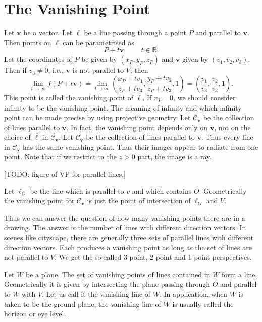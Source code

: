 \documentclass{amsart}
\newcommand{\cC}{\mathcal {C}}
\newcommand{\RR}{\mathbb {R}}
\newcommand {\bv} {\mathbf {v}}
\begin{document}
\section{The Vanishing Point}
\label{sec:vanishing-point}

Let $\bv$ be a vector. Let $\ell$ be a line passing through a point $P$ and parallel to $\bv$. Then points on $\ell$ can be parametrised as
\begin{equation*}
  P + t\bv,\qquad t\in\RR.
\end{equation*}
Let the coordinates of $P$ be given by $(x_P,y_P,z_P)$ and $\bv$ given by $(v_1,v_2,v_3)$. Then if $v_3\neq 0$, i.e., $\bv$ is not parallel to $V$, then
\begin{equation*}
  \lim_{t\rightarrow \infty} f (P + t\bv)
  = \lim_{t\rightarrow \infty} (\frac{x_P+tv_1}{z_P+tv_3},\frac{y_P+tv_2}{z_P+tv_3},1)
  = (\frac{v_1}{v_3},\frac{v_2}{v_3},1).
\end{equation*}
This point is called the vanishing point of $\ell$. If $v_3=0$, we should consider infinity to be the vanishing point. The meaning of infinity and which infinity point can be made precise by using projective geometry.
Let $\cC_\bv$ be the collection of lines parallel to $\bv$. In fact, the vanishing point depends only on $\bv$, not on the choice of $\ell$ in $\cC_\bv$. Let $\cC_\bv$ be the collection of lines parallel to $\bv$. Thus every line in $\cC_\bv$ has the same vanishing point. Thus their images appear to radiate from one point. Note that if we restrict to the $z>0$ part, the image is a ray.

[TODO: figure of VP for parallel lines.]


Let $\ell_O$ be the line which is parallel to $v$ and which contains $O$. Geometrically the vanishing point for $\cC_\bv$ is just the point of intersection of $\ell_O$ and $V$.

Thus we can answer the question of how many vanishing points there are in a drawing. The answer is the number of lines with different direction vectors. In scenes like cityscape, there are generally three sets of parallel lines with different direction vectors. Each produces a vanishing point as long as the set of lines are not parallel to $V$. We get the so-called 3-point, 2-point and 1-point perspectives.

Let $W$ be a plane. The set of vanishing points of lines contained in $W$ form a line. Geometrically it is given by intersecting the plane passing through $O$ and parallel to $W$ with $V$. Let us call it the vanishing line of $W$. In application, when $W$ is taken to be the ground plane, the  vanishing line  of $W$ is usually called the horizon or eye level.
\end{document}
